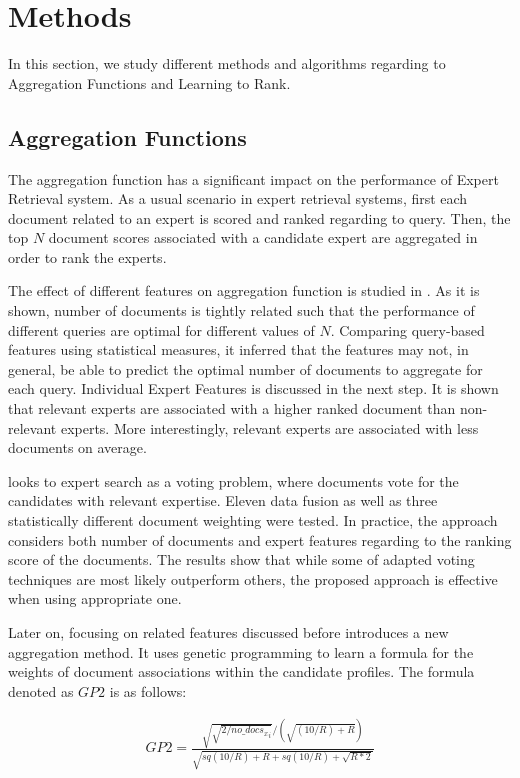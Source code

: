 \section{Methods}
\label{sec:methods}
In this section, we study different methods and algorithms regarding to Aggregation Functions and Learning to Rank.

\subsection{Aggregation Functions}
The aggregation function has a significant impact on the performance of Expert Retrieval system. As a usual scenario in expert retrieval systems, first each document related to an expert is scored and ranked regarding to query. Then, the top $N$ document scores associated with a candidate expert are aggregated in order to rank the experts. 

The effect of different features on aggregation function is studied in \citet{agg-gp2}. As it is shown, number of documents is tightly related such that the performance of different queries are optimal for different values of $N$. Comparing query-based features using statistical measures, it inferred that the features may not, in general, be able to predict the optimal number of documents to aggregate for each query. Individual Expert Features is discussed in the next step. It is shown that relevant experts are associated with a higher ranked document than non-relevant experts. More interestingly, relevant experts are associated with less documents on average.

\citet{agg-vote} looks to expert search as a voting problem, where documents vote for the candidates with relevant expertise. Eleven data fusion as well as three statistically different document weighting were tested. In practice, the approach considers both number of documents and expert features regarding to the ranking score of the documents. The results show that while some of adapted voting techniques are most likely outperform others, the proposed approach is effective when using appropriate one.

Later on, focusing on related features discussed before \citet{agg-gp2} introduces a new aggregation method. It uses genetic programming to learn a formula for the weights of document associations within the candidate profiles. The formula denoted as $GP2$ is as follows:

\begin{align*}
GP2 = \frac{\sqrt{\sqrt{2/{no\_docs_x}_i}}/(\sqrt{(10/R)+R})}{\sqrt{sq(10/R)+R+sq(10/R)+\sqrt{R*2}}}
\end{align*}

